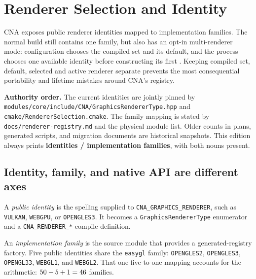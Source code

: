 \chapter{Renderer Selection and Identity}
\label{ch:renderer-selection-identity}

CNA exposes \RendererIdentityCount{} public renderer identities mapped to
\RendererFamilyCount{} implementation families. The normal build still contains one family, but
\CnaEditionTag{} also has an opt-in multi-renderer mode: configuration chooses the compiled set
and its default, and the process chooses one available identity before constructing its first
. Keeping compiled set, default, selected and active renderer separate
prevents the most consequential portability and lifetime mistakes around CNA's registry.



\begin{sourcenote}
\textbf{Authority order.} The current identities are jointly pinned by
\texttt{modules/core/include/CNA/\allowbreak{}GraphicsRendererType.hpp} and
\texttt{cmake/RendererSelection.cmake}. The family mapping is stated by
\texttt{docs/renderer-registry.md} and the physical module list. Older counts in plans, generated
scripts, and migration documents are historical snapshots. This edition always prints
\textbf{\RendererIdentityCount{} identities / \RendererFamilyCount{} implementation families},
with both nouns present.
\end{sourcenote}

\section{Identity, family, and native API are different axes}

A \emph{public identity} is the spelling supplied to
\texttt{CNA\_GRAPHICS\_RENDERER}, such as \texttt{VULKAN}, \texttt{WEBGPU}, or
\texttt{OPENGLES3}. It becomes a \texttt{GraphicsRendererType} enumerator and a
\texttt{CNA\_RENDERER\_*} compile definition.

An \emph{implementation family} is the source module that provides a generated-registry factory.
Five public identities share the \texttt{easygl} family:
\texttt{OPENGLES2}, \texttt{OPENGLES3}, \texttt{OPENGL33}, \texttt{WEBGL1}, and
\texttt{WEBGL2}. That one five-to-one mapping accounts for the arithmetic:
$50-5+1=46$ families.

